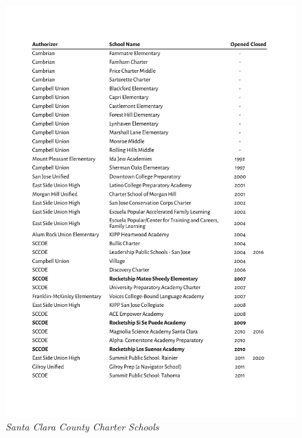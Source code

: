 
\begin{figure}[htb]
  \caption[Santa Clara County Charter Schools]{\textit{Santa Clara County Charter Schools}}\label{fig:SCCcharters}
  \includegraphics[page=1,width=\textwidth]{Santa_Clara_County_Charter_Schools}
\end{figure}

